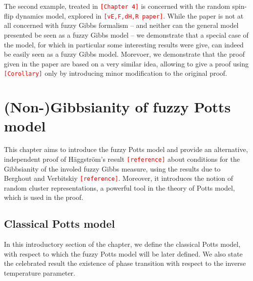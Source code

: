 \documentclass[12pt]{article}
\newcommand{\1}{\mathbbm{1}}
\newcommand{\5}{\vspace{0.5cm}}
\theoremstyle{definition}
\begin{document}
The second example, treated in \textcolor{red}{\texttt{[Chapter 4]}} is concerned with the random spin-flip dynamics model, explored in \textcolor{red}{\texttt{[vE,F,dH,R paper]}}. While the paper is not at all concerned with fuzzy Gibbs formalism -- and neither can the general model presented be seen as a fuzzy Gibbs model -- we demonstrate that a special case of the model, for which in particular some interesting results were give, can indeed be easily seen as a fuzzy Gibbs model. Morevoer, we demonstrate that the proof given in the paper are based on a very similar idea, allowing to give a proof using \textcolor{red}{\texttt{[Corollary]}} only by introducing minor modification to the original proof.


\pagebreak


\section{(Non-)Gibbsianity of fuzzy Potts model}

This chapter aims to introduce the fuzzy Potts model and provide an alternative, independent proof of H\"aggstr\"om's result \textcolor{red}{\texttt{[reference]}} about conditions for the Gibbsianity of the involed fuzzy Gibbs measure, using the results due to Berghout and Verbitskiy \textcolor{red}{\texttt{[reference]}}. Moreover, it introduces the notion of random cluster representations, a powerful tool in the theory of Potts model, which is used in the proof.


\subsection{Classical Potts model}

In this introductory section of the chapter, we define the classical Potts model, with respect to which the fuzzy Potts model will be later defined. We also state the celebrated result the existence of phase transition with respect to the inverse temperature parameter. \\
\end{document}
